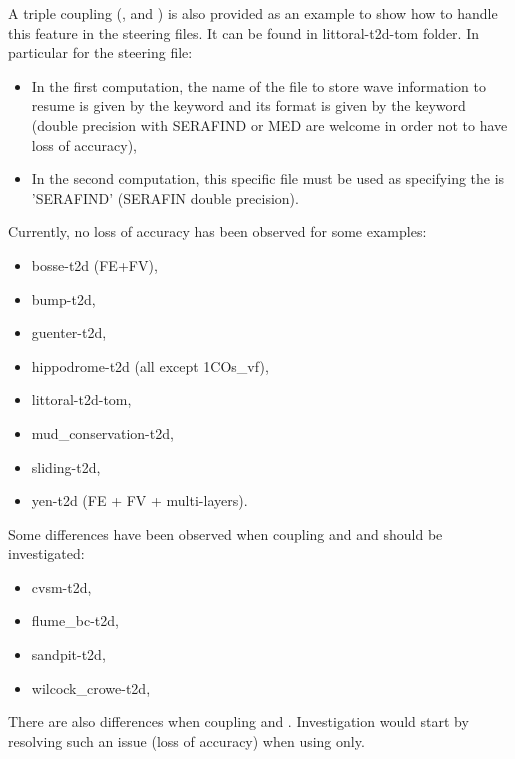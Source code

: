 A triple coupling (, \gaia{} and \tomawac{}) is also provided
as an example to show how to handle this feature in the steering files.
It can be found in littoral-t2d-tom folder.
In particular for the \tomawac steering file:
\begin{itemize}
\item In the first computation, the name of the file to store wave information
to resume is given by the keyword  and its format
is given by the keyword  (double precision
with SERAFIND or MED are welcome in order not to have loss of accuracy),

\item In the second computation, this specific file must be used as
 specifying the
 is 'SERAFIND'
(SERAFIN double precision).
\end{itemize}

Currently, no loss of accuracy has been observed for some examples:
\begin{itemize}
\item bosse-t2d (FE+FV),
\item bump-t2d,
\item guenter-t2d,
\item hippodrome-t2d (all except  1COs\_vf),
\item littoral-t2d-tom,
\item mud\_conservation-t2d,
\item sliding-t2d,
\item yen-t2d (FE + FV + multi-layers).
\end{itemize}

Some differences have been observed when coupling  and \gaia{} and
should be investigated:
\begin{itemize}
\item cvsm-t2d,
\item flume\_bc-t2d,
\item sandpit-t2d,
\item wilcock\_crowe-t2d,
\end{itemize}

There are also differences when coupling  and \gaia.
Investigation would start by resolving such an issue (loss of accuracy)
when using  only.
